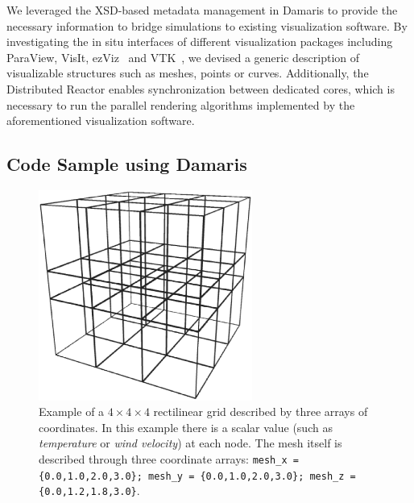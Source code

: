 %
%	
%
%	
%
We leveraged the XSD-based metadata management in Damaris to provide the
necessary information to bridge simulations to existing visualization 
software. By investigating the in situ interfaces of different visualization 
packages including ParaView, VisIt, ezViz~\cite{ezviz} and VTK~\cite{schroeder2000visualizing}, 
we devised a generic description of visualizable structures such as meshes, points or curves.
Additionally, the Distributed Reactor enables synchronization between dedicated cores,
which is necessary to run the parallel rendering algorithms implemented by the aforementioned visualization software.

\subsection{Code Sample using Damaris}\label{sec:damaris_viz:DamarisInSitu}

\begin{figure}
	\centering
	\caption{Example of a $4\times4\times4$ rectilinear grid described by three arrays
	of coordinates. In this example there is a 
	scalar value (such as \emph{temperature} or \emph{wind velocity}) at each node. The mesh itself
	is described through three coordinate arrays:
	\texttt{mesh\_x = \{0.0,1.0,2.0,3.0\}; mesh\_y = \{0.0,1.0,2.0,3.0\}; mesh\_z = \{0.0,1.2,1.8,3.0\}}.
	}
	\label{fig:mesh}
	\includegraphics[width=7cm]{figures/mesh.eps}
\end{figure}

